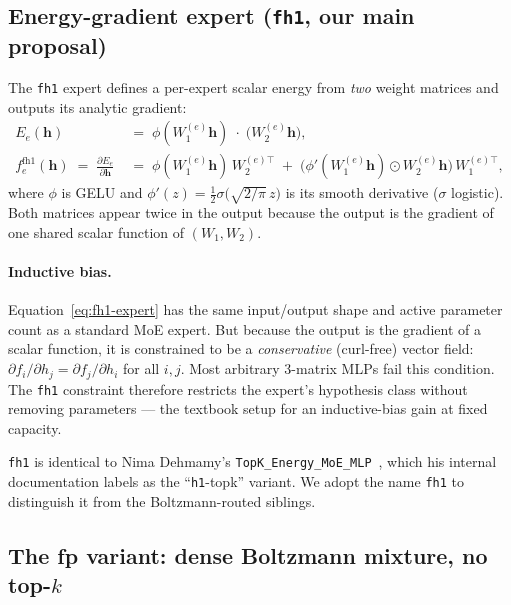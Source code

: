 \documentclass[oneside]{article}
\begin{document}
\subsection{Energy-gradient expert (\texttt{fh1}, our main proposal)}
\label{sec:fh1}

The \texttt{fh1} expert defines a per-expert scalar energy from
\emph{two} weight matrices and outputs its analytic gradient:
\begin{align}
  E_e(\mathbf{h}) &\;=\; \phi(W_1^{(e)} \mathbf{h})\;\cdot\;\big(W_2^{(e)} \mathbf{h}\big), \\
  f^{\mathrm{fh1}}_e(\mathbf{h}) \;=\; \frac{\partial E_e}{\partial \mathbf{h}}
    &\;=\; \phi(W_1^{(e)}\mathbf{h})\,W_2^{(e)\top}
       \;+\; \big(\phi'(W_1^{(e)}\mathbf{h}) \odot W_2^{(e)}\mathbf{h}\big)\,W_1^{(e)\top},
  \label{eq:fh1-expert}
\end{align}
where $\phi$ is GELU and
$\phi'(z)=\tfrac{1}{2}\sigma\!\big(\sqrt{2/\pi}\,z\big)$ is its smooth
derivative ($\sigma$ logistic). Both matrices appear twice in the output
because the output is the gradient of one shared scalar function of
$(W_1, W_2)$.

\paragraph{Inductive bias.}
Equation~\ref{eq:fh1-expert} has the same input/output shape and active
parameter count as a standard MoE expert. But because the output is the
gradient of a scalar function, it is constrained to be a
\emph{conservative} (curl-free) vector field:
$\partial f_i / \partial h_j = \partial f_j / \partial h_i$ for all
$i,j$. Most arbitrary 3-matrix MLPs fail this condition. The
\texttt{fh1} constraint therefore restricts the expert's hypothesis
class without removing parameters --- the textbook setup for an
inductive-bias gain at fixed capacity.

\texttt{fh1} is identical to Nima Dehmamy's
\texttt{TopK\_Energy\_MoE\_MLP}~\citep{dehmamy2026boltzmoe}, which his
internal documentation labels as the ``\texttt{h1}-topk'' variant. We
adopt the name \texttt{fh1} to distinguish it from the Boltzmann-routed
siblings.

\subsection{The fp variant: dense Boltzmann mixture, no top-$k$}
\label{sec:fp}
\end{document}
